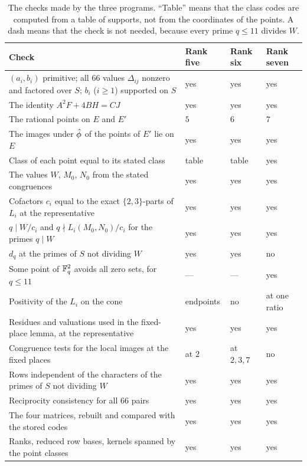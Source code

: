 \begin{table}[!htbp]
\centering\small
\begin{tabular}{@{}p{}p{}p{}p{}@{}}
\toprule
Check & Rank five & Rank six & Rank seven\\
\midrule
$(a_i,b_i)$ primitive; all $66$ values $\Delta_{ij}$ nonzero and factored over $S$; $b_i$ ($i\ge1$) supported on $S$ & yes & yes & yes\\
The identity $A^2F+4BH=CJ$ & yes & yes & yes\\
The rational points on $E$ and $E'$ & $5$ & $6$ & $7$\\
The images under $\hat\phi$ of the points of $E'$ lie on $E$ & yes & yes & yes\\
Class of each point equal to its stated class & table & table & yes\\
The values $W$, $M_0$, $N_0$ from the stated congruences & yes & yes & yes\\
Cofactors $c_i$ equal to the exact $\{2,3\}$-parts of $L_i$ at the representative & yes & yes & yes\\
$q\mid W/c_i$ and $q\nmid L_i(M_0,N_0)/c_i$ for the primes $q\mid W$ & yes & yes & yes\\
$d_q$ at the primes of $S$ not dividing $W$ & yes & yes & no\\
Some point of $\mathbb F_q^2$ avoids all zero sets, for $q\le11$ & --- & --- & yes\\
Positivity of the $L_i$ on the cone & endpoints & no & at one ratio\\
Residues and valuations used in the fixed-place lemma, at the representative & yes & yes & yes\\
Congruence tests for the local images at the fixed places & at $2$ & at $2,3,7$ & no\\
Rows independent of the characters of the primes of $S$ not dividing $W$ & yes & yes & yes\\
Reciprocity consistency for all $66$ pairs & yes & yes & yes\\
The four matrices, rebuilt and compared with the stored codes & yes & yes & yes\\
Ranks, reduced row bases, kernels spanned by the point classes & yes & yes & yes\\
\bottomrule
\end{tabular}
\caption{The checks made by the three programs. ``Table'' means that the class codes are computed from a table of supports, not from the coordinates of the points. A dash means that the check is not needed, because every prime $q\le11$ divides $W$.}
\label{tab:verification-scope}
\end{table}

